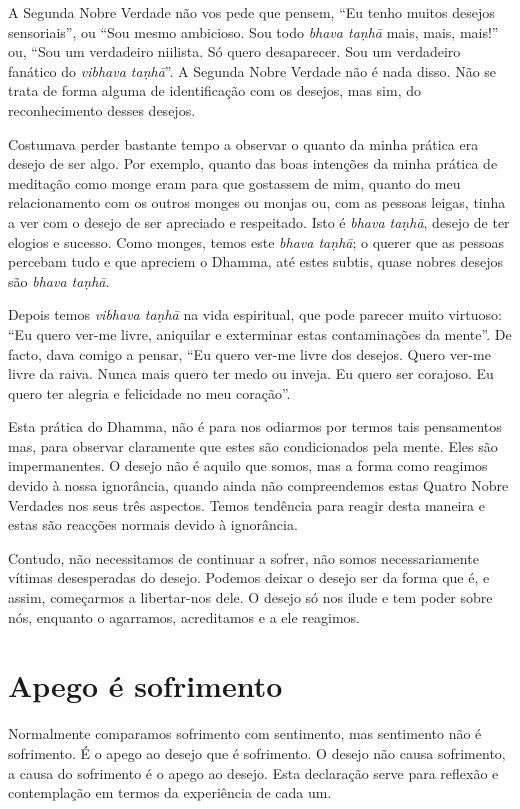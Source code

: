 A Segunda Nobre Verdade não vos pede que pensem, “Eu tenho muitos desejos
sensoriais”, ou “Sou mesmo ambicioso. Sou todo \emph{bhava taṇhā} mais, mais,
mais!” ou, “Sou um verdadeiro niilista. Só quero desaparecer. Sou um verdadeiro
fanático do \emph{vibhava taṇhā}”. A Segunda Nobre Verdade não é nada disso. Não
se trata de forma alguma de identificação com os desejos, mas sim, do
reconhecimento desses desejos.

Costumava perder bastante tempo a observar o quanto da minha prática era desejo
de ser algo. Por exemplo, quanto das boas intenções da minha prática de
meditação como monge eram para que gostassem de mim, quanto do meu
relacionamento com os outros monges ou monjas ou, com as pessoas leigas, tinha a
ver com o desejo de ser apreciado e respeitado. Isto é \emph{bhava taṇhā},
desejo de ter elogios e sucesso. Como monges, temos este \emph{bhava taṇhā}; o
querer que as pessoas percebam tudo e que apreciem o Dhamma, até estes subtis,
quase nobres desejos são \emph{bhava taṇhā}.

Depois temos \emph{vibhava taṇhā} na vida espiritual, que pode parecer muito
virtuoso: “Eu quero ver-me livre, aniquilar e exterminar estas contaminações da
mente”. De facto, dava comigo a pensar, “Eu quero ver-me livre dos desejos.
Quero ver-me livre da raiva. Nunca mais quero ter medo ou inveja. Eu quero ser
corajoso. Eu quero ter alegria e felicidade no meu coração”.

Esta prática do Dhamma, não é para nos odiarmos por termos tais pensamentos mas,
para observar claramente que estes são condicionados pela mente. Eles são
impermanentes. O desejo não é aquilo que somos, mas a forma como reagimos devido
à nossa ignorância, quando ainda não compreendemos estas Quatro Nobre Verdades
nos seus três aspectos. Temos tendência para reagir desta maneira e estas são
reacções normais devido à ignorância.

Contudo, não necessitamos de continuar a sofrer, não somos necessariamente
vítimas desesperadas do desejo. Podemos deixar o desejo ser da forma que é, e
assim, começarmos a libertar-nos dele. O desejo só nos ilude e tem poder sobre
nós, enquanto o agarramos, acreditamos e a ele reagimos.

\section{Apego é sofrimento}

Normalmente comparamos sofrimento com sentimento, mas sentimento não é
sofrimento. É o apego ao desejo que é sofrimento. O desejo não causa sofrimento,
a causa do sofrimento é o apego ao desejo. Esta declaração serve para reflexão e
contemplação em termos da experiência de cada um.

